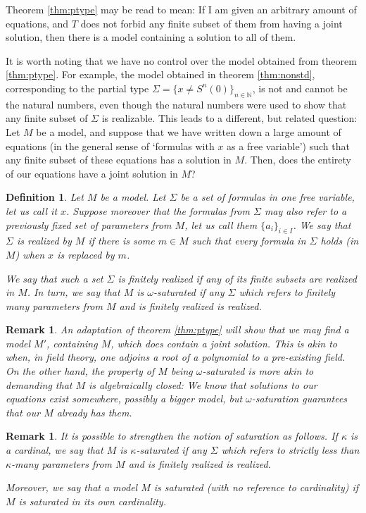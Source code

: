 \documentclass{article}
\newtheorem{remark}[theorem]{Remark}
\newtheorem{definition}[theorem]{Definition}
\theoremstyle{nonumberplain}
\newcommand{\N}{\mathbb{N}}
\begin{document}
Theorem \ref{thm:ptype} may be read to mean: If I am given an arbitrary amount of equations, and $T$ does not forbid any finite subset of them from having a joint solution, then there is a model containing a solution to all of them.

It is worth noting that we have no control over the model obtained from theorem \ref{thm:ptype}. For example, the model obtained in theorem \ref{thm:nonstd}, corresponding to the partial type $\Sigma = \{x \neq S^n(0)\}_{n \in \N}$, is not and cannot be the natural numbers, even though the natural numbers were used to show that any finite subset of $\Sigma$ is realizable. This leads to a different, but related question: Let $M$ be a model, and suppose that we have written down a large amount of equations (in the general sense of `formulas with $x$ as a free variable') such that any finite subset of these equations has a solution in $M$. Then, does the entirety of our equations have a joint solution in $M$?

\begin{definition}
Let $M$ be a model. Let $\Sigma$ be a set of formulas in one free variable, let us call it $x$. Suppose moreover that the formulas from $\Sigma$ may also refer to a previously fixed set of parameters from $M$, let us call them $\{a_i\}_{i \in I}$. We say that $\Sigma$ is \emph{realized by $M$} if there is some $m \in M$ such that every formula in $\Sigma$ holds (in $M$) when $x$ is replaced by $m$.

We say that such a set $\Sigma$ is \emph{finitely realized} if any of its finite subsets are realized in $M$. In turn, we say that $M$ is \emph{$\omega$-saturated} if any $\Sigma$ which refers to finitely many parameters from $M$ and is finitely realized is realized.
\end{definition}

\begin{remark}
An adaptation of theorem \ref{thm:ptype} will show that we may find a model $M'$, containing $M$, which does contain a joint solution. This is akin to when, in field theory, one adjoins a root of a polynomial to a pre-existing field. On the other hand, the property of $M$ being $\omega$-saturated is more akin to demanding that $M$ is algebraically closed: We know that solutions to our equations exist \emph{somewhere}, possibly a bigger model, but $\omega$-saturation guarantees that our $M$ already has them.
\end{remark}

\begin{remark}
It is possible to strengthen the notion of saturation as follows. If $\kappa$ is a cardinal, we say that $M$ is $\kappa$-saturated if any $\Sigma$ which refers to \emph{strictly less than} $\kappa$-many parameters from $M$ and is finitely realized is realized.

Moreover, we say that a model $M$ is saturated (with no reference to cardinality) if $M$ is saturated in its own cardinality.
\end{remark}
\end{document}
